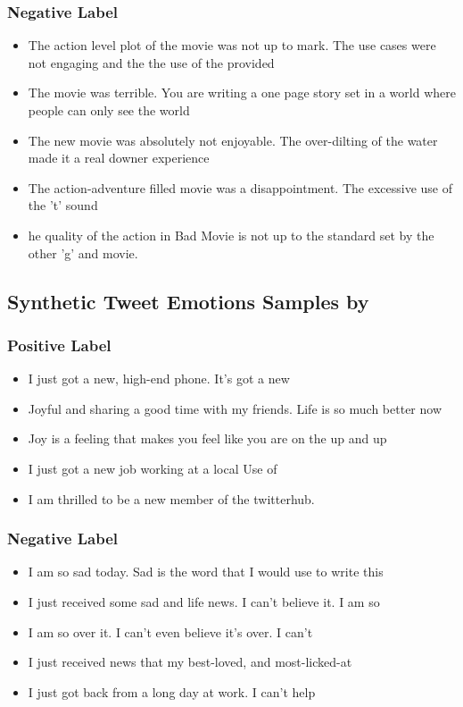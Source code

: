 \subsubsection{Negative Label}
\begin{itemize}
    \item The action level plot of the movie was not up to mark. The use cases were not engaging and the the use of the provided
    \item The movie was terrible. You are writing a one page story set in a world where people can only see the world
    \item The new movie was absolutely not enjoyable. The over-dilting of the water made it a real downer experience
    \item The action-adventure filled movie was a disappointment. The excessive use of the 't' sound
    \item he quality of the action in Bad Movie is not up to the standard set by the other 'g' and movie.
\end{itemize}

\subsection{Synthetic Tweet Emotions Samples by \alg}
\subsubsection{Positive Label}
\begin{itemize}
    \item I just got a new, high-end phone. It's got a new
    \item Joyful and sharing a good time with my friends. Life is so much better now
    \item Joy is a feeling that makes you feel like you are on the up and up
    \item I just got a new job working at a local Use of
    \item I am thrilled to be a new member of the twitterhub.
\end{itemize}
\subsubsection{Negative Label}
\begin{itemize}
    \item I am so sad today. Sad is the word that I would use to write this
    \item I just received some sad and life news. I can't believe it. I am so
    \item I am so over it. I can't even believe it's over. I can't
    \item I just received news that my best-loved, and most-licked-at
    \item I just got back from a long day at work. I can't help
\end{itemize}